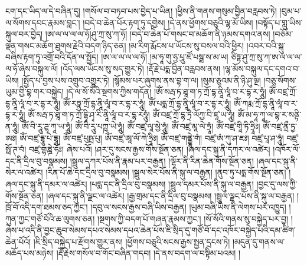 ངག་དང་ཡིད་ལ་དེ་བཞིན་དུ། །གསོལ་བ་བཏབ་པས་བྱེད་པ་ཡིན། །ཕྱིས་ནི་གནས་གསུམ་བྱིན་བརླབས་ཏེ། །བུམ་པ་ལ་སོགས་དབང་རྣམས་བླང་། །བདེ་བ་ཆེན་པོར་རྟག་ཏུ་དགྱེས། །དེ་ནས་ཕྱོགས་བཅུའི་ལྷ་མོ་ཡིས། །བསྟོད་པ་གླུ་ཡིས་སྐུལ་བར་བྱེད། །ཨ་ལ་ལ་ལ་ལ་ཧོ།ཤུ་ཀྲ་སུ་ཀ་ཧོ། །བདེ་བ་ཆེན་པོ་གསང་བ་མཆོག་ནི་ཉམས་དགའ་ནས། །བཅོམ་ལྡན་གསང་མཆོག་ཐུགས་རྗེའི་བདག་ཉིད་ཅན། །མ་རིག་རྨོངས་པ་ཡོངས་སུ་བསལ་བའི་ཕྱིར། །འབར་བའི་སྐུ་བཞིས་རྟག་ཏུ་འགྲོ་བའི་དོན་ལ་སྤྱོད། །ཨ་ལ་ལ་ལ་ལ་ཧོ། །མ་ཧཱ་གུ་ཧྱ་པཱུ་ཛོ་པསྠ་ས་མ་ཡ། ཙིཏྟ་ཤུ་ཀྲ་སུ་ཀ་ཨ་ལ་ལ་ལ་ལ་ཧོ་ཞེས་བསྐུལ་ལོ། །འོད་ལས་ཡོངས་སུ་སད་གྱུར་ཏེ། །རྡོ་རྗེ་པདྨ་བྱིན་བརླབས་ནས། །ལྷ་མོས་བསྐུལ་དང་དགའ་བ་ཡིས། །སྤྱོད་པ་བྱས་པས་འགྲུབ་འགྱུར་ཏེ། །སྙོམས་པར་ཞུགས་ནས་བྷ་ག་ལ། །སུམ་ཅུའམ་ནི་ཉི་ཤུ་ལྔ། །བཅུ་སོགས་ཡུམ་གྱི་བྷ་གར་བསྐྱེད། །དེ་ལ་སོ་སོའི་སྔགས་ཀྱིས་གདོན། །ཨོཾ་སརྦ་ཏ་ཐཱ་ག་ཏ་ཀྲོ་དྷ་ནཱི་ལཱཾ་བ་ར་དྷ་ར་ཧཱུཾ། ཨོཾ་བཛྲ་ཀྲོ་དྷ་ནཱི་ལཱཾ་བ་ར་དྷ་ར་ཧཱུཾ། ཨོཾ་རཏྣ་ཀྲོ་དྷ་ནཱི་ལཱཾ་བ་ར་དྷ་ར་ཧཱུཾ། ཨོཾ་པདྨ་ཀྲོ་དྷ་ནཱི་ལཱཾ་བ་ར་དྷ་ར་ཧཱུཾ། ཨོཾ་ཀརྨ་ཀྲོ་དྷ་ནཱི་ལཱཾ་བ་ར་དྷ་ར་ཧཱུཾ། ཨོཾ་སརྦ་ཏ་ཐཱ་ག་ཏ་ཀྲོ་དྷཱི་ཤྭ་རི་ནཱི་ལཱཾ་བ་ར་དྷ་རཧཱུཾ། ཨོཾ་བཛྲ་ཀྲོ་དྷ་ཏྲཻ་ལོཀྱ་བི་ཛཱ་ཡ་ཧཱུཾ། ཨོཾ་མ་ཧཱ་ཀཱ་ལ་བྷ་ར་སནྟི་ན་ཧཱུཾ། ཨོཾ་བི་རཱུ་ཌྷ་ཀཱ་ཡ་ཧཱུཾ། ཨོཾ་བི་རཱུ་པཀྵ་ཡེ་ཧཱུཾ། ཨོཾ་བཛྲ་ལཱ་སྱེ་ཧཱུཾ། ཨོཾ་བཛྲ་མཱ་ལེ་ཏྲཱཾ། ཨོཾ་བཛྲ་གཱི་ཏི་ཧྲཱིཿ། ཨོཾ་བཛྲ་ནྲྀ་ཏྱ་ཨཿ། ཨོཾ་བཛྲ་དྷཱུ་པེ་དྷཱུ། ཨོཾ་བཛྲ་པུཥྤ་པུ། ཨོཾ་བཛྲ་ཨཱ་ལོ་ཀེ་ཧྲཱིཿ། ཨོཾ་བཛྲ་གནྡྷེ་གཾ། བཛྲ་ཨཾ་ཀུ་ཤ་ཇཿ། བཛྲ་པཱ་ཤ་ཧཱུཾ། བཛྲ་སྥོ་ཊ་བཾ། བཛྲ་གྷཎྜེ་ཧོཿ། ཞེས་པའོ། །ཤར་དུ་སངས་རྒྱས་གོས་སྔོན་ཅན། །ཞལ་དང་སྐུ་ནི་དཀར་ལ་འཚེར། །འཁོར་ལོ་དང་ནི་དྲིལ་བུ་བསྣམས། །སྦྲུལ་དཀར་པོས་ནི་རྣམ་པར་བརྒྱན། །ལྷོར་ནི་རིན་ཆེན་གོས་སྔོན་ཅན། །ཞལ་དང་སྐུ་ནི་སེར་ལ་འཚེར། །རིན་པོ་ཆེ་དང་དྲིལ་བུ་བསྣམས། །སྦྲུལ་སེར་པོས་ནི་སྐུ་ལ་བརྒྱན། །ནུབ་ཏུ་པདྨ་གོས་སྔོན་ཅན། །ཞལ་དང་སྐུ་ནི་དམར་ལ་འཚེར། །པདྨ་དང་ནི་དྲིལ་བུ་བསྣམས། །སྦྲུལ་དམར་པོས་ནི་སྐུ་ལ་བརྒྱན། །བྱང་དུ་ལས་ཀྱི་གོས་སྔོན་ཅན། །ཞལ་དང་སྐུ་ནི་ལྗང་ལ་འཚེར། །རྒྱ་གྲམ་དང་ནི་དྲིལ་བུ་བསྣམས། །སྦྲུལ་ལྗང་པོས་ནི་སྐུ་ལ་བརྒྱན། །ཁྲོ་བོ་འདི་དག་ཐམས་ཅད་ཀྱང་། །དབུ་ལ་སངས་རྒྱས་བཞི་ཡིས་བརྒྱན། །ཡུམ་བཞི་ཡིས་ནི་ལེགས་པར་འཁྱུད། །ཀུན་ཀྱང་གཙོ་བོའི་ཆ་ལུགས་ཅན། །སྔགས་ཀྱི་བདག་པོ་གཞན་རྣམས་ཀྱང་། །སོ་སོའི་གནས་སུ་བསྐྱེད་པར་བྱ། །ཞེས་པ་འདི་ནི་བྱང་ཆུབ་སེམས་དཔའ་སེམས་དཔའ་ཆེན་པོས་ཇི་སྲིད་དུ་གཙོ་བོ་དང་འཁོར་བསྐྱེད་པའི་དམ་ཚིག་ཆེན་པོའོ། །ཇི་སྲིད་བསྐྱེད་པ་རྫོགས་གྱུར་ནས། །ཕྱོགས་བཅུའི་སངས་རྒྱས་སྤྱན་དྲངས་ཏེ། །མདུན་དུ་གནས་ལ་མཆོད་པས་མཉེས། །རྡོ་རྗེས་གསོལ་བ་གོང་བཞིན་གདབ། །དེ་ནས་བདག་ལ་བསྟིམ་པའམ། །
